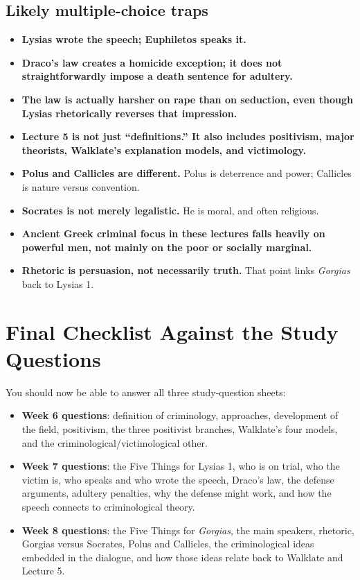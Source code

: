 \documentclass[11pt]{article}
\begin{document}
\subsection*{Likely multiple-choice traps}
\begin{itemize}
\item \textbf{Lysias wrote the speech; Euphiletos speaks it.}
\item \textbf{Draco's law creates a homicide exception; it does not straightforwardly impose a death sentence for adultery.}
\item \textbf{The law is actually harsher on rape than on seduction, even though Lysias rhetorically reverses that impression.}
\item \textbf{Lecture 5 is not just ``definitions.'' It also includes positivism, major theorists, Walklate's explanation models, and victimology.}
\item \textbf{Polus and Callicles are different.} Polus is deterrence and power; Callicles is nature versus convention.
\item \textbf{Socrates is not merely legalistic.} He is moral, and often religious.
\item \textbf{Ancient Greek criminal focus in these lectures falls heavily on powerful men, not mainly on the poor or socially marginal.}
\item \textbf{Rhetoric is persuasion, not necessarily truth.} That point links \textit{Gorgias} back to Lysias 1.
\end{itemize}

\section*{Final Checklist Against the Study Questions}
You should now be able to answer all three study-question sheets:
\begin{itemize}
\item \textbf{Week 6 questions}: definition of criminology, approaches, development of the field, positivism, the three positivist branches, Walklate's four models, and the criminological/victimological other.
\item \textbf{Week 7 questions}: the Five Things for Lysias 1, who is on trial, who the victim is, who speaks and who wrote the speech, Draco's law, the defense arguments, adultery penalties, why the defense might work, and how the speech connects to criminological theory.
\item \textbf{Week 8 questions}: the Five Things for \textit{Gorgias}, the main speakers, rhetoric, Gorgias versus Socrates, Polus and Callicles, the criminological ideas embedded in the dialogue, and how those ideas relate back to Walklate and Lecture 5.
\end{itemize}
\end{document}

